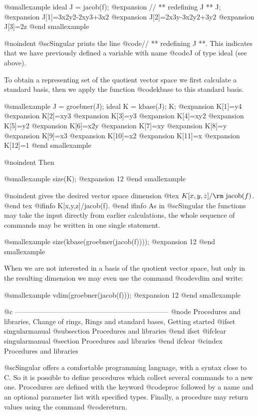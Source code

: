 @smallexample
ideal J = jacob(f);
@expansion{} // ** redefining J **
J;
@expansion{} J[1]=3x2y2-2xy3+3x2
@expansion{} J[2]=2x3y-3x2y2+3y2
@expansion{} J[3]=2z
@end smallexample

@noindent @sc{Singular} prints the line @code{// ** redefining J
**}. This indicates that we have previously defined a variable with name
@code{J} of type ideal (see above).

To obtain a representing set of the quotient vector space we first
calculate a standard basis, then we apply the function @code{kbase} to
this standard basis.

@smallexample
J = groebner(J);
ideal K = kbase(J);
K;
@expansion{} K[1]=y4
@expansion{} K[2]=xy3
@expansion{} K[3]=y3
@expansion{} K[4]=xy2
@expansion{} K[5]=y2
@expansion{} K[6]=x2y
@expansion{} K[7]=xy
@expansion{} K[8]=y
@expansion{} K[9]=x3
@expansion{} K[10]=x2
@expansion{} K[11]=x
@expansion{} K[12]=1
@end smallexample

@noindent Then

@smallexample
size(K);
@expansion{} 12
@end smallexample

@noindent gives the desired vector space dimension
@tex
$K[x,y,z]/\hbox{\rm jacob}(f)$.
@end tex
@ifinfo
K[x,y,z]/jacob(f).
@end ifinfo
As in @sc{Singular} the functions may take the input directly from
earlier calculations, the whole sequence of commands may be written
in one single statement.

@smallexample
size(kbase(groebner(jacob(f))));
@expansion{} 12
@end smallexample

When we are not interested in a basis of the quotient vector space, but
only in the resulting dimension we may even use the command @code{vdim}
and write:

@smallexample
vdim(groebner(jacob(f)));
@expansion{} 12
@end smallexample

@c ------------------------------------------------------------------
@node Procedures and libraries, Change of rings, Rings and standard bases, Getting started
@ifset singularmanual
@subsection Procedures and libraries
@end ifset
@ifclear singularmanual
@section Procedures and libraries
@end ifclear
@cindex Procedures and libraries

@sc{Singular} offers a comfortable programming language, with a syntax
close to C. So it is possible to define procedures which collect several
commands to a new one. Procedures are defined with the keyword
@code{proc} followed by a name and an optional parameter list with
specified types.  Finally, a procedure may return values using the
command @code{return}.

